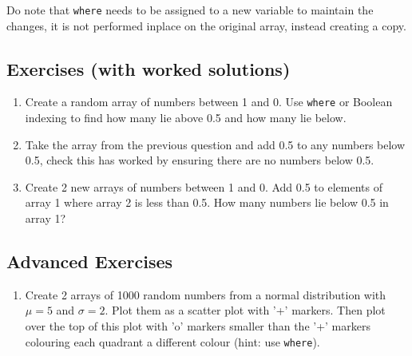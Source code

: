 Do note that \texttt{where} needs to be assigned to a new variable to maintain the changes, it is not performed inplace on the original array, instead creating a copy.

\subsection{Exercises (with worked solutions)} \label{sec:exc_where}
\begin{enumerate}
\item Create a random array of numbers between 1 and 0. Use \texttt{where} or Boolean indexing to find how many lie above 0.5 and how many lie below.
\item Take the array from the previous question and add 0.5 to any numbers below 0.5, check this has worked by ensuring there are no numbers below 0.5.
\item Create 2 new arrays of numbers between 1 and 0. Add 0.5 to elements of array 1 where array 2 is less than 0.5. How many numbers lie below 0.5 in array 1?
\end{enumerate}

\subsection{Advanced Exercises}
\begin{enumerate}
\item Create 2 arrays of 1000 random numbers from a normal distribution with $\mu=5$ and $\sigma=2$. Plot them as a scatter plot with '+' markers. Then plot over the top of this plot with 'o' markers smaller than the '+' markers colouring each quadrant a different colour (hint: use \texttt{where}).
\end{enumerate}

